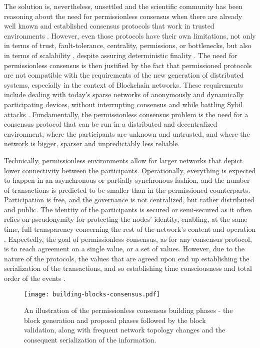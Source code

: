 The solution is, nevertheless, unsettled and the scientific community has been reasoning about the need for permissionless consensus when there are already well known and established consensus protocols that work in trusted environments \cite{castro1999practical, miller2016honey}. However, even those protocols have their own limitations, not only in terms of trust, fault-tolerance, centrality, permissions, or bottlenecks, but also in terms of scalability \cite{miller2016honey}, despite assuring deterministic finality \cite{decker2016bitcoin}. The need for permissionless consensus is then justified by the fact that permissioned protocols are not compatible with the requirements of the new generation of distributed systems, especially in the context of Blockchain networks. These requirements include dealing with today's sparse networks of anonymously and dynamically participating devices, without interrupting consensus and while battling Sybil attacks \cite{8629877, survey-dist-consensus}. Fundamentally, the permissionless consensus problem is the need for a consensus protocol that can be run in a distributed and decentralized environment, where the participants are unknown and untrusted, and where the network is bigger, sparser and unpredictably less reliable.

Technically, permissionless environments allow for larger networks that depict lower connectivity between the participants. Operationally, everything is expected to happen in an asynchronous or partially synchronous fashion, and the number of transactions is predicted to be smaller than in the permissioned counterparts. Participation is free, and the governance is not centralized, but rather distributed and public. The identity of the participants is secured or semi-secured as it often relies on pseudonymity for protecting the nodes' identity, enabling, at the same time, full transparency concerning the rest of the network's content and operation \cite{xiao2019distributed}. Expectedly, the goal of permissionless consensus, as for any consensus protocol, is to reach agreement on a single value, or a set of values. However, due to the nature of the protocols, the values that are agreed upon end up establishing the serialization of the transactions, and so establishing time consciousness and total order of the events \cite{8629877}.

\begin{figure}[ht]
  \begin{center}
  \texttt{[image: building-blocks-consensus.pdf]}
  \caption{An illustration of the permissionless consensus building phases - 
  the block generation and proposal phases followed by the block validation, 
  along with frequent network topology changes and the consequent serialization of the information.}
  \label{fig:building-blocks-consensus}
  \end{center}
\end{figure}

